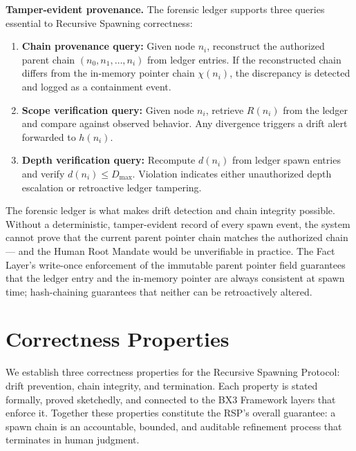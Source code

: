 \medskip
\noindent\textbf{Tamper-evident provenance.} The forensic ledger supports three queries essential to Recursive Spawning correctness:

\begin{enumerate}
    \itemsep0em
    \item \textbf{Chain provenance query:} Given node $n_i$, reconstruct the authorized parent chain $(n_0, n_1, \ldots, n_i)$ from ledger entries. If the reconstructed chain differs from the in-memory pointer chain $\chi(n_i)$, the discrepancy is detected and logged as a containment event.
    \item \textbf{Scope verification query:} Given node $n_i$, retrieve $R(n_i)$ from the ledger and compare against observed behavior. Any divergence triggers a drift alert forwarded to $h(n_i)$.
    \item \textbf{Depth verification query:} Recompute $d(n_i)$ from ledger spawn entries and verify $d(n_i) \leq D_{\mathrm{max}}$. Violation indicates either unauthorized depth escalation or retroactive ledger tampering.
\end{enumerate}

The forensic ledger is what makes drift detection and chain integrity possible. Without a deterministic, tamper-evident record of every spawn event, the system cannot prove that the current parent pointer chain matches the authorized chain — and the Human Root Mandate would be unverifiable in practice. The Fact Layer's write-once enforcement of the immutable parent pointer field guarantees that the ledger entry and the in-memory pointer are always consistent at spawn time; hash-chaining guarantees that neither can be retroactively altered.

\section{Correctness Properties}
\label{sec:rs-correctness}

We establish three correctness properties for the Recursive Spawning Protocol: drift prevention, chain integrity, and termination. Each property is stated formally, proved sketchedly, and connected to the BX3 Framework layers that enforce it. Together these properties constitute the RSP's overall guarantee: a spawn chain is an accountable, bounded, and auditable refinement process that terminates in human judgment.


